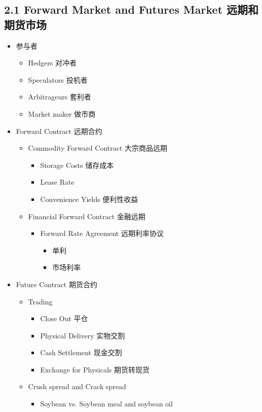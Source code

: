 \documentclass[a4paper,6pt,twoside,openany]{article}
\begin{document}
\subsection*{2.1 Forward Market and Futures Market 远期和期货市场}
\begin{itemize}
\item 参与者
  \begin{itemize}
  \item Hedgers 对冲者
  \item Speculators 投机者
  \item Arbitrageurs 套利者
  \item Market maker 做市商
  \end{itemize}
\item Forward Contract 远期合约
  \begin{itemize}
  \item Commodity Forward Contract 大宗商品远期
    \begin{itemize}
    \item Storage Costs 储存成本
    \item Lease Rate
    \item Convenience Yields 便利性收益
    \end{itemize}
  \item Financial Forward Contract 金融远期
    \begin{itemize}
    \item Forward Rate Agreement 远期利率协议
      \begin{itemize}
      \item 单利
      \item 市场利率
      \end{itemize}
    \end{itemize}
  \end{itemize}
\item Future Contract 期货合约
  \begin{itemize}
  \item Trading
    \begin{itemize}
    \item Close Out 平仓
    \item Physical Delivery 实物交割
    \item Cash Settlement 现金交割
    \item Exchange for Physicals 期货转现货
    \end{itemize}
  \item Crush spread and Crack spread
    \begin{itemize}
    \item Soybean vs. Soybean meal and soybean oil

\end{itemize}
\end{itemize}
\end{itemize}
\end{document}
